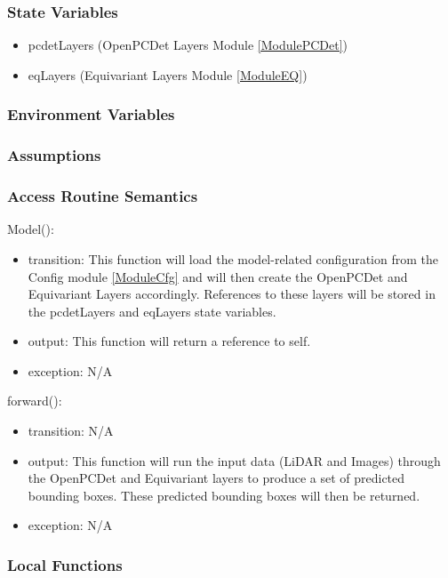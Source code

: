 \documentclass[12pt, titlepage]{article}
\begin{document}
\subsubsection{State Variables}
\begin{itemize}
  \item pcdetLayers (OpenPCDet Layers Module \ref{ModulePCDet})
  \item eqLayers (Equivariant Layers Module \ref{ModuleEQ})
\end{itemize}

\subsubsection{Environment Variables}


\subsubsection{Assumptions}

\subsubsection{Access Routine Semantics}
\noindent Model():
\begin{itemize}
\item transition: This function will load the model-related configuration from the Config module \ref{ModuleCfg} and will then create the OpenPCDet and Equivariant Layers accordingly. References to these layers will be stored in the pcdetLayers and eqLayers state variables. 
\item output: This function will return a reference to self.
\item exception: N/A
\end{itemize}

\noindent forward():
\begin{itemize}
\item transition: N/A 
\item output: This function will run the input data (LiDAR and Images) through the OpenPCDet and Equivariant layers to produce a set of predicted bounding boxes. These predicted bounding boxes will then be returned. 
\item exception: N/A
\end{itemize}

\subsubsection{Local Functions}
\end{document}
